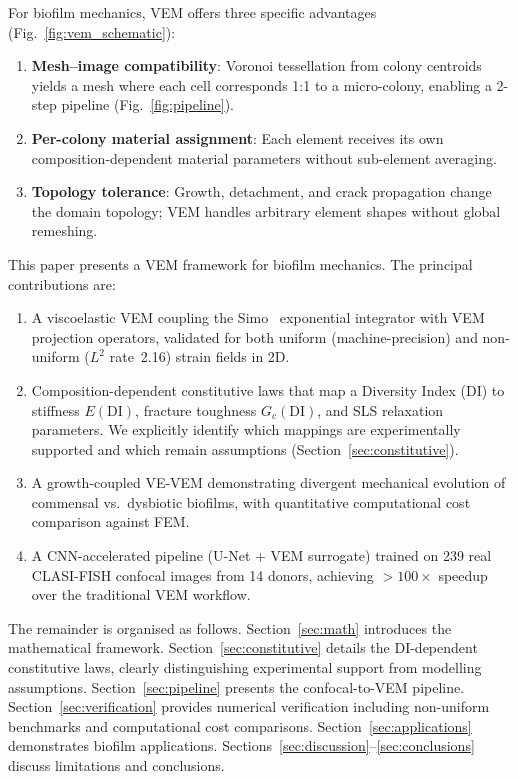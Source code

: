 \documentclass[smallextended]{svjour3}
\newcommand{\DI}{\mathrm{DI}}
\begin{document}
For biofilm mechanics, VEM offers three specific advantages
(Fig.~\ref{fig:vem_schematic}):
\begin{enumerate}[nosep]
  \item \textbf{Mesh--image compatibility}: Voronoi tessellation from
    colony centroids yields a mesh where each cell corresponds 1:1
    to a micro-colony, enabling a 2-step pipeline
    (Fig.~\ref{fig:pipeline}).
  \item \textbf{Per-colony material assignment}: Each element receives
    its own composition-dependent material parameters without
    sub-element averaging.
  \item \textbf{Topology tolerance}: Growth, detachment, and crack
    propagation change the domain topology; VEM handles arbitrary
    element shapes without global remeshing.
\end{enumerate}

This paper presents a VEM framework for biofilm mechanics.
The principal contributions are:
\begin{enumerate}[nosep]
  \item[(i)] A viscoelastic VEM coupling the Simo~\cite{Simo1987}
    exponential integrator with VEM projection operators,
    validated for both uniform (machine-precision) and non-uniform
    ($L^2$ rate~2.16) strain fields in 2D.
  \item[(ii)] Composition-dependent constitutive laws that map a
    Diversity Index (DI) to stiffness $E(\DI)$, fracture toughness
    $G_c(\DI)$, and SLS relaxation parameters.
    We explicitly identify which mappings are experimentally
    supported and which remain assumptions
    (Section~\ref{sec:constitutive}).
  \item[(iii)] A growth-coupled VE-VEM demonstrating divergent
    mechanical evolution of commensal vs.\ dysbiotic biofilms,
    with quantitative computational cost comparison against FEM.
  \item[(iv)] A CNN-accelerated pipeline (U-Net + VEM surrogate)
    trained on 239 real CLASI-FISH confocal images from 14 donors,
    achieving $>100\times$ speedup over the traditional VEM workflow.
\end{enumerate}

The remainder is organised as follows.
Section~\ref{sec:math} introduces the mathematical framework.
Section~\ref{sec:constitutive} details the DI-dependent constitutive
laws, clearly distinguishing experimental support from modelling
assumptions.
Section~\ref{sec:pipeline} presents the confocal-to-VEM pipeline.
Section~\ref{sec:verification} provides numerical verification
including non-uniform benchmarks and computational cost comparisons.
Section~\ref{sec:applications} demonstrates biofilm applications.
Sections~\ref{sec:discussion}--\ref{sec:conclusions} discuss
limitations and conclusions.
\end{document}
